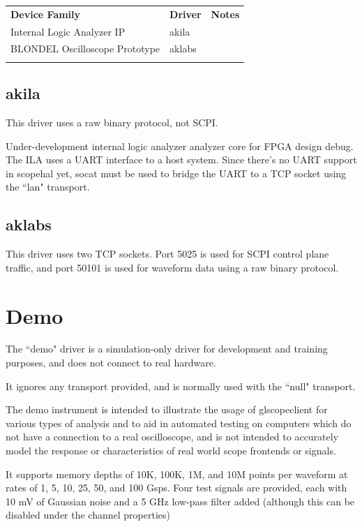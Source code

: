 \begin{tabularx}{16cm}{llX}
\thickhline
\textbf{Device Family} & \textbf{Driver} & \textbf{Notes} \\
\thickhline
Internal Logic Analyzer IP & akila & \\
\thickhline
BLONDEL Oscilloscope Prototype & aklabs & \\
\thickhline
\end{tabularx}

\subsection{akila}

This driver uses a raw binary protocol, not SCPI.

Under-development internal logic analyzer analyzer core for FPGA design debug. The ILA uses a UART interface to a host
system. Since there's no UART support in scopehal yet, socat must be used to bridge the UART to a TCP socket using
the ``lan" transport.

\subsection{aklabs}

This driver uses two TCP sockets. Port 5025 is used for SCPI control plane traffic, and port 50101 is used for waveform
data using a raw binary protocol.

\section{Demo}

The ``demo" driver is a simulation-only driver for development and training purposes, and does not connect to real
hardware.

It ignores any transport provided, and is normally used with the ``null" transport.

The demo instrument is intended to illustrate the usage of glscopeclient for various types of analysis and to aid in
automated testing on computers which do not have a connection to a real oscilloscope, and is not intended to accurately
model the response or characteristics of real world scope frontends or signals.

It supports memory depths of 10K, 100K, 1M, and 10M points per waveform at rates of 1, 5, 10, 25, 50, and 100 Gsps.
Four test signals are provided, each with 10 mV of Gaussian noise and a 5 GHz low-pass filter added (although this can
be disabled under the channel properties)

